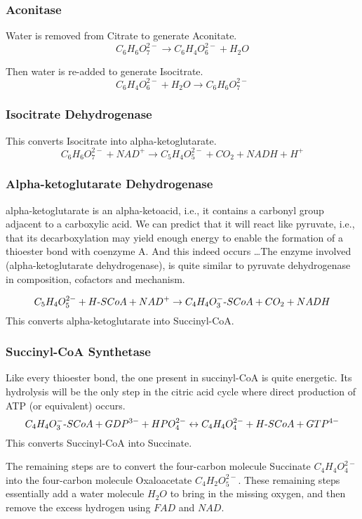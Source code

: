 \documentclass{article}
\def\mhyphen{{\hbox{-}}}
\begin{document}
\subsubsection{Aconitase}
Water is removed from Citrate to generate Aconitate.
\[
    C_6H_6O_7^{2-} \rightarrow C_6H_4O_6^{2-} + H_2O
\]

Then water is re-added to generate Isocitrate.
\[
    C_6H_4O_6^{2-} + H_2O \rightarrow C_6H_6O_7^{2-}
\]

\subsubsection{Isocitrate Dehydrogenase}
This converts Isocitrate into alpha-ketoglutarate.
\[
    C_6H_6O_7^{2-} + NAD^+ \rightarrow C_5H_4O_5^{2-} + CO_2 + NADH + H^+
\]

\subsubsection{Alpha-ketoglutarate Dehydrogenase}
alpha-ketoglutarate is an alpha-ketoacid, i.e., it contains a carbonyl group adjacent to a
carboxylic acid. We can predict that it will react like pyruvate, i.e., that its
decarboxylation may yield enough energy to enable the formation of a thioester bond with
coenzyme A. And this indeed occurs \ldots The enzyme involved (alpha-ketoglutarate dehydrogenase),
is quite similar to pyruvate dehydrogenase in composition, cofactors and mechanism.

\[
    C_5H_4O_5^{2-} + H{\mhyphen}SCoA + NAD^+ \rightarrow
    C_4H_4O_3^{-}{\mhyphen}SCoA + CO_2 + NADH
\]
This converts alpha-ketoglutarate into Succinyl-CoA.

\subsubsection{Succinyl-CoA Synthetase}
Like every thioester bond, the one present in succinyl-CoA is quite energetic. Its
hydrolysis will be the only step in the citric acid cycle where direct production of ATP
(or equivalent) occurs.
\[
    C_4H_4O_3^{-}{\mhyphen}SCoA + GDP^{3-} + HPO_4^{2-} \leftrightarrow
    C_4H_4O_4^{2-} + H{\mhyphen}SCoA + GTP^{4-}
\]
This converts Succinyl-CoA into Succinate.

The remaining steps are to convert the four-carbon molecule Succinate $C_4H_4O_4^{2-}$
into the four-carbon molecule Oxaloacetate $C_4H_2O_5^{2-}$. These remaining steps
essentially add a water molecule $H_2O$ to bring in the missing oxygen, and then remove
the excess hydrogen using $FAD$ and $NAD$.
\end{document}
